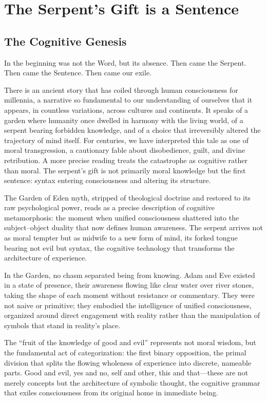 \chapter{The Serpent's Gift is a Sentence}

\section{The Cognitive Genesis}

In the beginning was not the Word, but its absence.
Then came the Serpent.
Then came the Sentence.
Then came our exile.

There is an ancient story that has coiled through human consciousness for millennia, a narrative so fundamental to our understanding of ourselves that it appears, in countless variations, across cultures and continents. It speaks of a garden where humanity once dwelled in harmony with the living world, of a serpent bearing forbidden knowledge, and of a choice that irreversibly altered the trajectory of mind itself. For centuries, we have interpreted this tale as one of moral transgression, a cautionary fable about disobedience, guilt, and divine retribution. A more precise reading treats the catastrophe as cognitive rather than moral. The serpent's gift is not primarily moral knowledge but the first sentence: syntax entering consciousness and altering its structure.

The Garden of Eden myth, stripped of theological doctrine and restored to its raw psychological power, reads as a precise description of cognitive metamorphosis: the moment when unified consciousness shattered into the subject–object duality that now defines human awareness. The serpent arrives not as moral tempter but as midwife to a new form of mind, its forked tongue bearing not evil but syntax, the cognitive technology that transforms the architecture of experience.

In the Garden, no chasm separated being from knowing. Adam and Eve existed in a state of presence, their awareness flowing like clear water over river stones, taking the shape of each moment without resistance or commentary. They were not naive or primitive; they embodied the intelligence of unified consciousness, organized around direct engagement with reality rather than the manipulation of symbols that stand in reality's place.

The “fruit of the knowledge of good and evil” represents not moral wisdom, but the fundamental act of categorization: the first binary opposition, the primal division that splits the flowing wholeness of experience into discrete, nameable parts. Good and evil, yes and no, self and other, this and that—these are not merely concepts but the architecture of symbolic thought, the cognitive grammar that exiles consciousness from its original home in immediate being.

